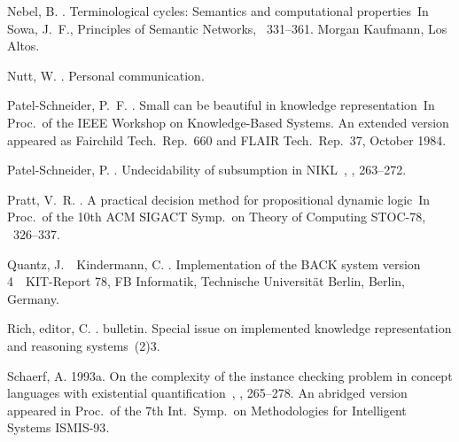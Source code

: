 \begin{thebibliography}{}
Nebel, B. \BBCP.
\newblock \BBOQ Terminological cycles: Semantics and computational
  properties\BBCQ\
\newblock In Sowa, J.~F.\BED, {\Bem Principles of Semantic Networks}, \BPGS\
  331--361. Morgan Kaufmann, Los Altos.

Nutt, W. \BBCP.
\newblock Personal communication.

{Patel-Schneider}, P.~F. \BBCP.
\newblock \BBOQ Small can be beautiful in knowledge representation\BBCQ\
\newblock In {\Bem Proc.\ of the {IEEE} Workshop on Knowledge-Based Systems}.
\newblock An extended version appeared as Fairchild Tech.\ Rep.\ 660 and
  {FLAIR} Tech.\ Rep.\ 37, October 1984.

{Patel-Schneider}, P. \BBOP1989\BBCP.
\newblock \BBOQ Undecidability of subsumption in {NIKL}\BBCQ\
, {}, 263--272.

Pratt, V.~R. \BBOP1978\BBCP.
\newblock \BBOQ A practical decision method for propositional dynamic
  logic\BBCQ\
\newblock In {\Bem Proc.\ of the 10th ACM SIGACT Symp.\ on Theory of Computing
  STOC-78}, \BPGS\ 326--337.

Quantz, J.\BBACOMMA\  \BBA\ Kindermann, C. \BBCP.
\newblock \BBOQ Implementation of the {BACK} system version 4\BBCQ\
\newblock \BTR\ {KIT}-Report 78, {FB} Informatik, Technische Universit{\"a}t
  Berlin, Berlin, Germany.

{Rich, editor}, C. \BBOP1991\BBCP.
\newblock \BBOQ {SIGART} bulletin. {S}pecial issue on implemented knowledge
  representation and reasoning systems\BBCQ\
\newblock (2)3.

Schaerf, A. \BBOP1993a\BBCP.
\newblock \BBOQ On the complexity of the instance checking problem in concept
  languages with existential quantification\BBCQ\
, {},
  265--278.
\newblock An abridged version appeared in {\Bem Proc.\ of the 7th Int.\ Symp.\
  on Methodologies for Intelligent Systems ISMIS-93}.


\end{thebibliography}
